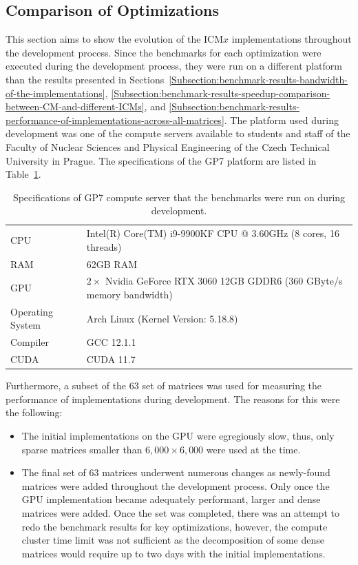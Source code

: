 \subsection{Comparison of Optimizations \TO}
This section aims to show the evolution of the ICM$ x $ implementations throughout the development process. Since the benchmarks for each optimization were executed during the development process, they were run on a different platform than the results presented in Sections~\ref{Subsection:benchmark-results-bandwidth-of-the-implementations}, \ref{Subsection:benchmark-results-speedup-comparison-between-CM-and-different-ICMs}, and \ref{Subsection:benchmark-results-performance-of-implementations-across-all-matrices}. The platform used during development was one of the compute servers available to students and staff of the Faculty of Nuclear Sciences and Physical Engineering of the Czech Technical University in Prague. The specifications of the GP7 platform are listed in Table~\ref{Table:benchmark-results-comparison-of-optimizations}.

\begin{table}[ht!]
	\centering
	\begin{tabular}{|l|l|}
		\hline
		CPU              & Intel(R) Core(TM) i9-9900KF CPU @ 3.60GHz (8 cores, 16 threads) \\
		RAM              & 62GB RAM \\
		GPU              & $ 2\times $ Nvidia GeForce RTX 3060 12GB GDDR6 (360 GByte/s memory bandwidth) \\
		Operating System & Arch Linux (Kernel Version: 5.18.8) \\
		Compiler         & GCC 12.1.1 \\
		CUDA             & CUDA 11.7 \\ \hline
	\end{tabular}
	\caption{Specifications of GP7 compute server that the benchmarks were run on during development.}
	\label{Table:benchmark-results-comparison-of-optimizations}
\end{table}

Furthermore, a subset of the 63 set of matrices was used for measuring the performance of implementations during development. The reasons for this were the following:

\begin{itemize}
	\item The initial implementations on the GPU were egregiously slow, thus, only sparse matrices smaller than $ 6,000\times 6,000 $ were used at the time.
	\item The final set of 63 matrices underwent numerous changes as newly-found matrices were added throughout the development process. Only once the GPU implementation became adequately performant, larger and dense matrices were added. Once the set was completed, there was an attempt to redo the benchmark results for key optimizations, however, the compute cluster time limit was not sufficient as the decomposition of some dense matrices would require up to two days with the initial implementations.
\end{itemize}

